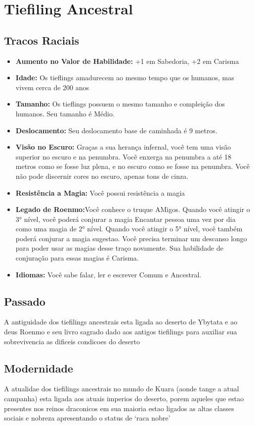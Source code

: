 \documentclass{book}
\begin{document}
\chapter{Tiefiling Ancestral}
\section{Tracos Raciais}
\begin{itemize}
    \item \textbf{Aumento no Valor de Habilidade:} +1 em Sabedoria, +2 em Carisma
    \item \textbf{Idade:} Os tieflings amadurecem ao mesmo tempo que os humanos, mas vivem 
          cerca de 200 anos
    \item \textbf{Tamanho:} Os tieflings possuem o mesmo tamanho e compleição dos humanos. 
          Seu tamanho é Médio.
    \item \textbf{Deslocamento:} Seu deslocamento base de caminhada é 9 metros.
    \item \textbf{Visão no Escuro:} Graças a sua herança infernal, você tem uma visão superior 
          no escuro e na penumbra. Você enxerga na penumbra a até 18 metros como se fosse 
          luz plena, e no escuro como se fosse na penumbra. Você não pode discernir cores 
          no escuro, apenas tons de cinza.
    \item \textbf{Resistência a Magia:} Você possui resistência a magia
    \item \textbf{Legado de Roenmo:}Você conhece o truque AMigos. Quando você atingir o
          3° nível, você poderá conjurar a magia Encantar pessoa uma vez por dia
          como uma magia de 2° nível. Quando você atingir o 5° nível, você também poderá 
          conjurar a magia sugestao. Você precisa terminar um descanso longo para poder usar
          as magias desse traço novamente. Sua habilidade de conjuração para essas magias é 
          Carisma.
    \item \textbf{Idiomas:} Você sabe falar, ler e escrever Comum e Ancestral.

\end{itemize}
\section{Passado}
A antiguidade dos tiefilings ancestrais esta ligada ao deserto de Ybytata e ao deus Roenmo 
e seu livro sagrado dado aos antigos tiefilings para auxiliar sua sobrevivencia as dificeis 
condicoes do deserto 
\section{Modernidade}
A atualidae dos tiefilings ancestrais no mundo de Kuara (aonde tange a atual campanha) esta 
ligada aos atuais imperios do deserto, porem aqueles que estao presentes nos reinos draconicos 
em sua maioria estao ligados as altas classes sociais e nobreza apresentando o status de `raca
nobre'
\end{document}
